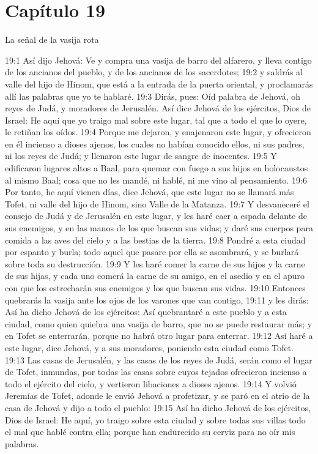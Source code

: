 \section*{Capítulo 19 }
La señal de la vasija rota 
 
19:1 Así dijo Jehová: Ve y compra una vasija de barro del alfarero, y lleva contigo de los ancianos del pueblo, y de los ancianos de los sacerdotes; 
19:2 y saldrás al valle del hijo de Hinom, que está a la entrada de la puerta oriental, y proclamarás allí las palabras que yo te hablaré. 
19:3 Dirás, pues: Oíd palabra de Jehová, oh reyes de Judá, y moradores de Jerusalén. Así dice Jehová de los ejércitos, Dios de Israel: He aquí que yo traigo mal sobre este lugar, tal que a todo el que lo oyere, le retiñan los oídos. 
19:4 Porque me dejaron, y enajenaron este lugar, y ofrecieron en él incienso a dioses ajenos, los cuales no habían conocido ellos, ni sus padres, ni los reyes de Judá; y llenaron este lugar de sangre de inocentes. 
19:5 Y edificaron lugares altos a Baal, para quemar con fuego a sus hijos en holocaustos al mismo Baal; cosa que no les mandé, ni hablé, ni me vino al pensamiento. 
19:6 Por tanto, he aquí vienen días, dice Jehová, que este lugar no se llamará más Tofet, ni valle del hijo de Hinom, sino Valle de la Matanza. 
19:7 Y desvaneceré el consejo de Judá y de Jerusalén en este lugar, y les haré caer a espada delante de sus enemigos, y en las manos de los que buscan sus vidas; y daré sus cuerpos para comida a las aves del cielo y a las bestias de la tierra. 
19:8 Pondré a esta ciudad por espanto y burla; todo aquel que pasare por ella se asombrará, y se burlará sobre toda su destrucción. 
19:9 Y les haré comer la carne de sus hijos y la carne de sus hijas, y cada uno comerá la carne de su amigo, en el asedio y en el apuro con que los estrecharán sus enemigos y los que buscan sus vidas. 
19:10 Entonces quebrarás la vasija ante los ojos de los varones que van contigo, 
19:11 y les dirás: Así ha dicho Jehová de los ejércitos: Así quebrantaré a este pueblo y a esta ciudad, como quien quiebra una vasija de barro, que no se puede restaurar más; y en Tofet se enterrarán, porque no habrá otro lugar para enterrar. 
19:12 Así haré a este lugar, dice Jehová, y a sus moradores, poniendo esta ciudad como Tofet. 
19:13 Las casas de Jerusalén, y las casas de los reyes de Judá, serán como el lugar de Tofet, inmundas, por todas las casas sobre cuyos tejados ofrecieron incienso a todo el ejército del cielo, y vertieron libaciones a dioses ajenos. 
19:14 Y volvió Jeremías de Tofet, adonde le envió Jehová a profetizar, y se paró en el atrio de la casa de Jehová y dijo a todo el pueblo: 
19:15 Así ha dicho Jehová de los ejércitos, Dios de Israel: He aquí, yo traigo sobre esta ciudad y sobre todas sus villas todo el mal que hablé contra ella; porque han endurecido su cerviz para no oír mis palabras. 
